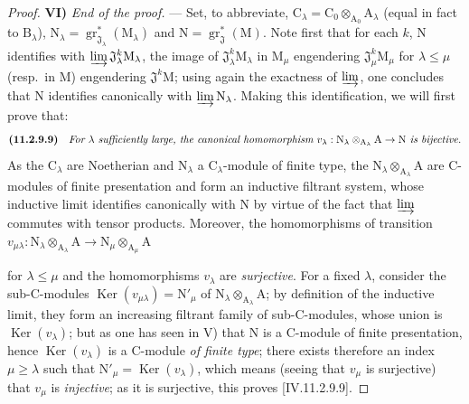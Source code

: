 \begin{proof}
\medskip
\noindent\textbf{VI)} \emph{End of the proof.} --- Set, to abbreviate, $\mathrm{C}_\lambda=\mathrm{C}_0\otimes_{\mathrm{A}_0}\mathrm{A}_\lambda$ (equal in fact to $\mathrm{B}_\lambda$), $\mathrm{N}_\lambda=\operatorname{gr}^*_{\mathfrak{J}_\lambda}(\mathrm{M}_\lambda)$ and $\mathrm{N}=\operatorname{gr}^*_\mathfrak{J}(\mathrm{M})$. Note first that for each $k$, $\mathrm{N}$ identifies with $\varinjlim\mathfrak{J}^k_\lambda\mathrm{M}_\lambda$, the image of $\mathfrak{J}^k_\lambda\mathrm{M}_\lambda$ in $\mathrm{M}_\mu$ engendering $\mathfrak{J}^k_\mu\mathrm{M}_\mu$ for $\lambda\leqslant\mu$ (resp.\ in $\mathrm{M}$) engendering $\mathfrak{J}^k\mathrm{M}$; using again the exactness of $\varinjlim$, one concludes that $\mathrm{N}$ identifies canonically with $\varinjlim\mathrm{N}_\lambda$. Making this identification, we will first prove that:
\begin{equation}
\textbf{(11.2.9.9)}\quad
\text{\emph{For $\lambda$ sufficiently large, the canonical homomorphism $v_\lambda:\mathrm{N}_\lambda\otimes_{\mathrm{A}_\lambda}\mathrm{A}\to\mathrm{N}$ is bijective.}}
\end{equation}
As the $\mathrm{C}_\lambda$ are Noetherian and $\mathrm{N}_\lambda$ a $\mathrm{C}_\lambda$-module of finite type, the $\mathrm{N}_\lambda\otimes_{\mathrm{A}_\lambda}\mathrm{A}$ are C-modules of finite presentation and form an inductive filtrant system, whose inductive limit identifies canonically with $\mathrm{N}$ by virtue of the fact that $\varinjlim$ commutes with tensor products. Moreover, the homomorphisms of transition $v_{\mu\lambda}:\mathrm{N}_\lambda\otimes_{\mathrm{A}_\lambda}\mathrm{A}\to\mathrm{N}_\mu\otimes_{\mathrm{A}_\mu}\mathrm{A}$


for $\lambda\leqslant\mu$ and the homomorphisms $v_\lambda$ are \emph{surjective}. For a fixed $\lambda$, consider the sub-C-modules $\operatorname{Ker}(v_{\mu\lambda})=\mathrm{N}'_\mu$ of $\mathrm{N}_\lambda\otimes_{\mathrm{A}_\lambda}\mathrm{A}$; by definition of the inductive limit, they form an increasing filtrant family of sub-C-modules, whose union is $\operatorname{Ker}(v_\lambda)$; but as one has seen in V) that $\mathrm{N}$ is a C-module of finite presentation, hence $\operatorname{Ker}(v_\lambda)$ is a C-module \emph{of finite type}; there exists therefore an index $\mu\geqslant\lambda$ such that $\mathrm{N}'_\mu=\operatorname{Ker}(v_\lambda)$, which means (seeing that $v_\mu$ is surjective) that $v_\mu$ is \emph{injective}; as it is surjective, this proves [IV.11.2.9.9].


\end{proof}
